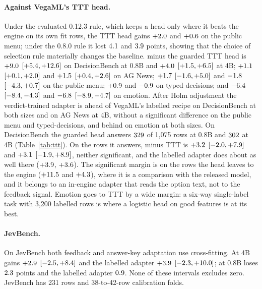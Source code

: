 \paragraph{Against VegaML's TTT head.}
Under the evaluated 0.12.3 rule, which keeps a head only where it beats the engine on its own fit rows, the TTT head gains $+2.0$ and $+0.6$ on the public menu; under the 0.8.0 rule it lost $4.1$ and $3.9$ points, showing that the choice of selection rule materially changes the baseline. \pk{} minus the guarded TTT head is $+9.0$ $[+5.4, +12.6]$ on DecisionBench at 0.8B and $+4.0$ $[+1.5, +6.5]$ at 4B; $+1.1$ $[+0.1, +2.0]$ and $+1.5$ $[+0.4, +2.6]$ on AG News; $+1.7$ $[-1.6, +5.0]$ and $-1.8$ $[-4.3, +0.7]$ on the public menu; $+0.9$ and $-0.9$ on typed-decisions; and $-6.4$ $[-8.4, -4.3]$ and $-6.8$ $[-8.9, -4.7]$ on emotion. After Holm adjustment the verdict-trained adapter is ahead of VegaML's labelled recipe on DecisionBench at both sizes and on AG News at 4B, without a significant difference on the public menu and typed-decisions, and behind on emotion at both sizes. On DecisionBench the guarded head answers $329$ of 1,075 rows at 0.8B and $302$ at 4B (Table~\ref{tab:ttt}). On the rows it answers, \pk{} minus TTT is $+3.2$ $[-2.0, +7.9]$ and $+3.1$ $[-1.9, +8.9]$, neither significant, and the labelled adapter does about as well there ($+3.9$, $+3.6$). The significant margin is on the rows the head leaves to the engine ($+11.5$ and $+4.3$), where it is a comparison with the released model, and it belongs to an in-engine adapter that reads the option text, not to the feedback signal. Emotion goes to TTT by a wide margin: a six-way single-label task with 3,200 labelled rows is where a logistic head on good features is at its best.

\paragraph{JevBench.}
On JevBench both feedback and answer-key adaptation use cross-fitting. At 4B \pk{} gains $+2.9$ $[-2.5, +8.4]$ and the labelled adapter $+3.9$ $[-2.3, +10.0]$; at 0.8B \pk{} loses $2.3$ points and the labelled adapter $0.9$. None of these intervals excludes zero. JevBench has 231 rows and 38-to-42-row calibration folds.

